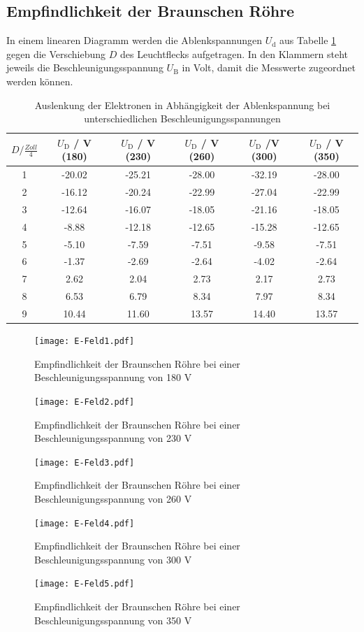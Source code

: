 \subsection{Empfindlichkeit der Braunschen Röhre}
In einem linearen Diagramm werden die Ablenkspannungen $U_\text{d}$ aus Tabelle \ref{tab:DIS} gegen die Verschiebung $D$ des Leuchtflecks aufgetragen. In den Klammern steht jeweils die Beschleunigungsspannung $U_\text{B}$ in Volt, damit die Messwerte zugeordnet werden können.
\begin{table}[H]
  \centering
  \begin{tabular}{c| c c c c c }
    \toprule
    $D / \frac{Zoll}{4}$ & $U_\text{D}$ / V (180) & $U_\text{D}$ / V (230) & $U_\text{D}$ / V (260) & $U_\text{D}$ /V (300) & $U_\text{D}$ / V (350) \\
    \midrule
    1 &	-20.02	&-25.21	&-28.00	&-32.19	&-28.00	\\
    2 &	-16.12	&-20.24	&-22.99	&-27.04	&-22.99	\\
    3 &	-12.64	&-16.07	&-18.05	&-21.16	&-18.05	\\
    4 &	-8.88	&-12.18	&-12.65	&-15.28	&-12.65	\\
    5 &	-5.10	&-7.59	&-7.51	&-9.58	&-7.51	\\
    6 &	-1.37	&-2.69	&-2.64	&-4.02	&-2.64	\\
    7 &	2.62	&2.04	&2.73	&2.17	&2.73	\\
    8 &	6.53	&6.79	&8.34	&7.97	&8.34	\\
    9 &	10.44	&11.60	&13.57	&14.40	&13.57	\\
    \bottomrule
  \end{tabular}
  \caption{Auslenkung der Elektronen in Abhängigkeit der Ablenkspannung bei unterschiedlichen Beschleunigungsspannungen}
  \label{tab:DIS}
\end{table}
\begin{figure}[H]
  \centering
  \texttt{[image: E-Feld1.pdf]}
  \caption{Empfindlichkeit der Braunschen Röhre bei einer Beschleunigungsspannung von 180 V}
  \label{fig:empf}
\end{figure}
\begin{figure}[H]
  \centering
  \texttt{[image: E-Feld2.pdf]}
  \caption{Empfindlichkeit der Braunschen Röhre bei einer Beschleunigungsspannung von 230 V}
  \label{fig:empf}
\end{figure}
\begin{figure}[H]
  \centering
  \texttt{[image: E-Feld3.pdf]}
  \caption{Empfindlichkeit der Braunschen Röhre bei einer Beschleunigungsspannung von 260 V}
  \label{fig:empf}
\end{figure}
\begin{figure}[H]
  \centering
  \texttt{[image: E-Feld4.pdf]}
  \caption{Empfindlichkeit der Braunschen Röhre bei einer Beschleunigungsspannung von 300 V}
  \label{fig:empf}
\end{figure}
\begin{figure}[H]
  \centering
  \texttt{[image: E-Feld5.pdf]}
  \caption{Empfindlichkeit der Braunschen Röhre bei einer Beschleunigungsspannung von 350 V}
  \label{fig:empf}
\end{figure}

